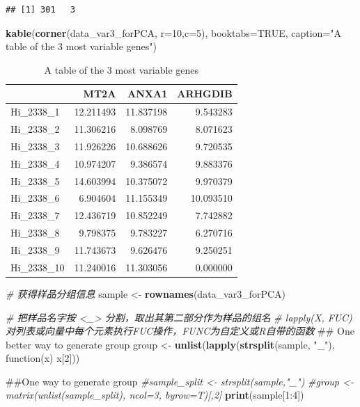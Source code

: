 \documentclass[]{article}
\newenvironment{Shaded}{\begin{snugshade}}{\end{snugshade}}
\newcommand{\KeywordTok}[1]{\textcolor[rgb]{0.13,0.29,0.53}{\textbf{{#1}}}}
\newcommand{\DataTypeTok}[1]{\textcolor[rgb]{0.13,0.29,0.53}{{#1}}}
\newcommand{\DecValTok}[1]{\textcolor[rgb]{0.00,0.00,0.81}{{#1}}}
\newcommand{\StringTok}[1]{\textcolor[rgb]{0.31,0.60,0.02}{{#1}}}
\newcommand{\CommentTok}[1]{\textcolor[rgb]{0.56,0.35,0.01}{\textit{{#1}}}}
\newcommand{\OtherTok}[1]{\textcolor[rgb]{0.56,0.35,0.01}{{#1}}}
\newcommand{\NormalTok}[1]{{#1}}
\numberwithin{figure}{section}
\numberwithin{table}{section}
\theoremstyle{definition}
\theoremstyle{definition}
\theoremstyle{definition}
\theoremstyle{remark}
\begin{document}
\begin{verbatim}
## [1] 301   3
\end{verbatim}

\begin{Shaded}
\begin{Highlighting}[]
\KeywordTok{kable}\NormalTok{(}\KeywordTok{corner}\NormalTok{(data_var3_forPCA, }\DataTypeTok{r=}\DecValTok{10}\NormalTok{,}\DataTypeTok{c=}\DecValTok{5}\NormalTok{), }\DataTypeTok{booktabs=}\OtherTok{TRUE}\NormalTok{, }
        \DataTypeTok{caption=}\StringTok{"A table of the 3 most variable genes"}\NormalTok{)}
\end{Highlighting}
\end{Shaded}

\begin{table}

\caption{\label{tab:varsel}A table of the 3 most variable genes}
\centering
\begin{tabular}[t]{lrrr}
\toprule
  & MT2A & ANXA1 & ARHGDIB\\
\midrule
Hi\_2338\_1 & 12.211493 & 11.837198 & 9.543283\\
Hi\_2338\_2 & 11.306216 & 8.098769 & 8.071623\\
Hi\_2338\_3 & 11.926226 & 10.688626 & 9.720535\\
Hi\_2338\_4 & 10.974207 & 9.386574 & 9.883376\\
Hi\_2338\_5 & 14.603994 & 10.375072 & 9.970379\\
\addlinespace
Hi\_2338\_6 & 6.904604 & 11.155349 & 10.093510\\
Hi\_2338\_7 & 12.436719 & 10.852249 & 7.742882\\
Hi\_2338\_8 & 9.798375 & 9.783227 & 6.270716\\
Hi\_2338\_9 & 11.743673 & 9.626476 & 9.250251\\
Hi\_2338\_10 & 11.240016 & 11.303056 & 0.000000\\
\bottomrule
\end{tabular}
\end{table}

\begin{Shaded}
\begin{Highlighting}[]
\CommentTok{# 获得样品分组信息}
\NormalTok{sample <-}\StringTok{ }\KeywordTok{rownames}\NormalTok{(data_var3_forPCA)}

\CommentTok{# 把样品名字按 <_> 分割，取出其第二部分作为样品的组名}
\CommentTok{# lapply(X, FUC) 对列表或向量中每个元素执行FUC操作，FUNC为自定义或R自带的函数}
\NormalTok{## One better way to generate group}
\NormalTok{group <-}\StringTok{ }\KeywordTok{unlist}\NormalTok{(}\KeywordTok{lapply}\NormalTok{(}\KeywordTok{strsplit}\NormalTok{(sample, }\StringTok{"_"}\NormalTok{), function(x) x[}\DecValTok{2}\NormalTok{]))}

\NormalTok{##One way to generate group}
\CommentTok{#sample_split <- strsplit(sample,"_")}
\CommentTok{#group <- matrix(unlist(sample_split), ncol=3, byrow=T)[,2]}
\KeywordTok{print}\NormalTok{(sample[}\DecValTok{1}\NormalTok{:}\DecValTok{4}\NormalTok{])}
\end{Highlighting}
\end{Shaded}
\end{document}
